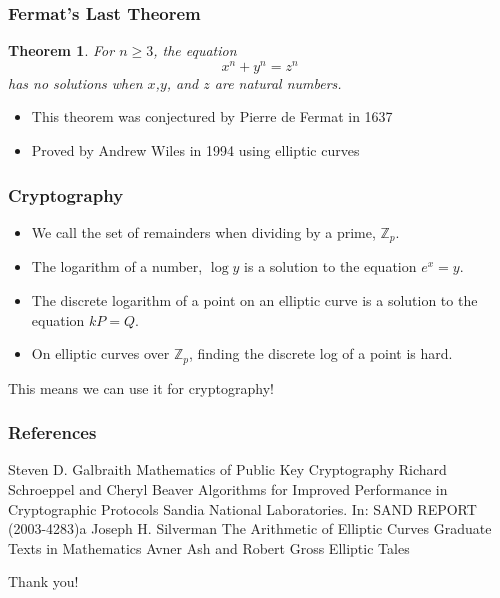 \documentclass[xcolor=pdftex,dvipsnames,table]{beamer}
\theoremstyle{plain}
\newtheorem{thm}{Theorem}
\theoremstyle{definition}
\def\ZZ{\mathbb{Z}}
\begin{document}
\begin{frame}
	\frametitle{Fermat's Last Theorem}
	
	\begin{thm}
	For $n\geq 3$, the equation
	\[
		x^n+y^n = z^n
	\]
	has no solutions when $x$,$y$, and $z$ are natural numbers.
	\end{thm}
	
	\begin{itemize}
	\item This theorem was conjectured by Pierre de Fermat in 1637
	\item Proved by Andrew Wiles in 1994 using elliptic curves
	\end{itemize}
\end{frame}

\begin{frame}
	\frametitle{Cryptography}
	
	\begin{itemize}
	\item We call the set of remainders when dividing by a prime, $\ZZ_p$.
	\item The logarithm of a number, $\log y$ is a solution to the equation $e^x=y$.
	\item The discrete logarithm of a point on an elliptic curve is a solution to the equation $kP=Q$.
	\item On elliptic curves over $\ZZ_p$, finding the discrete log of a point is hard.
	\end{itemize}
	
	This means we can use it for cryptography!
\end{frame}

\begin{frame}[allowframebreaks]
\frametitle{References}
\begin{thebibliography}{10}    
		Steven D. Galbraith
		\newblock Mathematics of Public Key Cryptography
		Richard Schroeppel and Cheryl Beaver
		\newblock Algorithms for Improved Performance in Cryptographic Protocols
		\newblock Sandia National Laboratories. In: SAND REPORT (2003-4283)a
		Joseph H. Silverman
		\newblock The Arithmetic of Elliptic Curves
		\newblock Graduate Texts in Mathematics
		Avner {Ash} and Robert {Gross}
		\newblock Elliptic Tales
\end{thebibliography}
\end{frame}

\begin{frame}
\begin{Large}
\begin{center}
Thank you!
\end{center}
\end{Large}
\end{frame}
\end{document}
